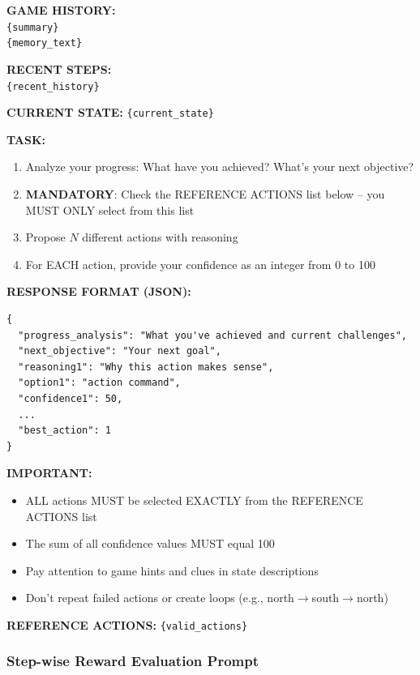 \begin{promptbox}[title=Jericho Action Generation User Prompt]
\small
\textbf{GAME HISTORY:}\\
\texttt{\{summary\}}\\
\texttt{\{memory\_text\}}

\textbf{RECENT STEPS:}\\
\texttt{\{recent\_history\}}

\textbf{CURRENT STATE:} \texttt{\{current\_state\}}

\textbf{TASK:}
\begin{enumerate}[leftmargin=*,nosep]
    \item Analyze your progress: What have you achieved? What's your next objective?
    \item \textbf{MANDATORY}: Check the REFERENCE ACTIONS list below -- you MUST ONLY select from this list
    \item Propose $N$ different actions with reasoning
    \item For EACH action, provide your confidence as an integer from 0 to 100
\end{enumerate}

\textbf{RESPONSE FORMAT (JSON):}
\begin{verbatim}
{
  "progress_analysis": "What you've achieved and current challenges",
  "next_objective": "Your next goal",
  "reasoning1": "Why this action makes sense",
  "option1": "action command",
  "confidence1": 50,
  ...
  "best_action": 1
}
\end{verbatim}

\textbf{IMPORTANT:}
\begin{itemize}[leftmargin=*,nosep]
    \item ALL actions MUST be selected EXACTLY from the REFERENCE ACTIONS list
    \item The sum of all confidence values MUST equal 100
    \item Pay attention to game hints and clues in state descriptions
    \item Don't repeat failed actions or create loops (e.g., north$\rightarrow$south$\rightarrow$north)
\end{itemize}

\textbf{REFERENCE ACTIONS:} \texttt{\{valid\_actions\}}
\end{promptbox}

\subsubsection{Step-wise Reward Evaluation Prompt}

